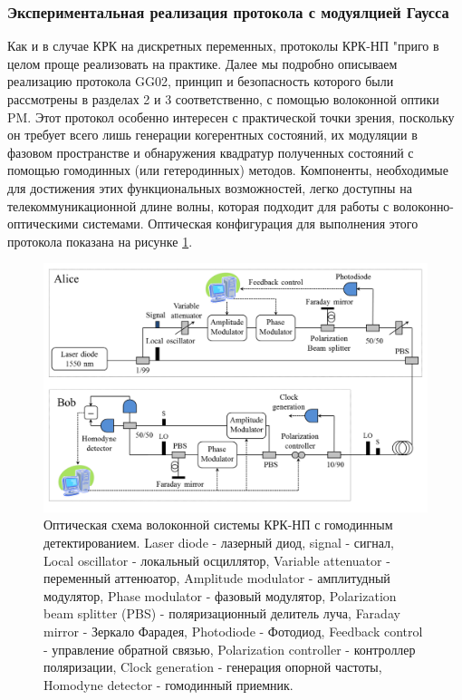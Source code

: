 \subsubsection{Экспериментальная реализация протокола с модуялцией Гаусса} \label{GG02 exp lit}Как и в случае КРК на дискретных переменных, протоколы КРК-НП "приго в целом проще реализовать на практике. Далее мы подробно описываем реализацию протокола GG02, принцип и безопасность которого были рассмотрены в разделах 2 и 3 соответственно, с помощью волоконной оптики PM. Этот протокол особенно интересен с практической точки зрения, поскольку он требует всего лишь генерации когерентных состояний, их модуляции в фазовом пространстве и обнаружения квадратур полученных состояний с помощью гомодинных (или гетеродинных) методов. Компоненты, необходимые для достижения этих функциональных возможностей, легко доступны на телекоммуникационной длине волны, которая подходит для работы с волоконно-оптическими системами. Оптическая конфигурация для выполнения этого протокола показана на рисунке \ref{fig:gg02 lit}.
\begin{figure}
    \centering
    \includegraphics[width=\textwidth]{images/gg02 lit.png}
    \caption{Оптическая схема волоконной системы КРК-НП с гомодинным детектированием. Laser diode - лазерный диод, signal - сигнал, Local oscillator - локальный осциллятор, Variable attenuator - переменный аттенюатор, Amplitude modulator - амплитудный модулятор, Phase modulator - фазовый модулятор, Polarization beam splitter (PBS) - поляризационный делитель луча, Faraday mirror - Зеркало Фарадея, Photodiode - Фотодиод, Feedback control - управление обратной связью, Polarization controller - контроллер поляризации, Clock generation - генерация опорной частоты, Homodyne detector - гомодинный приемник.}
    \label{fig:gg02 lit}
\end{figure}
